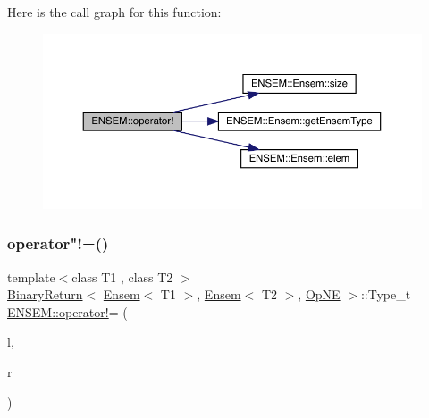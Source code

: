 Here is the call graph for this function\+:\nopagebreak
\begin{figure}[H]
\begin{center}
\leavevmode
\includegraphics[width=350pt]{d1/d9e/group__eensem_gad6dafbd7d34da088e6eaf463aa56e301_cgraph}
\end{center}
\end{figure}
\mbox{\label{group__eensem_ga9f462a3d207e1a214ab95765f6fb90d3}} 
\subsubsection{\texorpdfstring{operator"!=()}{operator!=()}\hspace{0.1cm}{\footnotesize\ttfamily [1/3]}}
{\footnotesize\ttfamily template$<$class T1 , class T2 $>$ \\
\mbox{\hyperlink{structENSEM_1_1BinaryReturn}{Binary\+Return}}$<$ \mbox{\hyperlink{classENSEM_1_1Ensem}{Ensem}}$<$ T1 $>$, \mbox{\hyperlink{classENSEM_1_1Ensem}{Ensem}}$<$ T2 $>$, \mbox{\hyperlink{structENSEM_1_1OpNE}{Op\+NE}} $>$\+::Type\+\_\+t \mbox{\hyperlink{group__escalar_ga248e30ef2d97325ac4b11c077bc514dd}{E\+N\+S\+E\+M\+::operator!}}= (\begin{DoxyParamCaption}\item[{const \mbox{\hyperlink{classENSEM_1_1Ensem}{Ensem}}$<$ T1 $>$ \&}]{l,  }\item[{const \mbox{\hyperlink{classENSEM_1_1Ensem}{Ensem}}$<$ T2 $>$ \&}]{r }\end{DoxyParamCaption})\hspace{0.3cm}{\ttfamily [inline]}}

